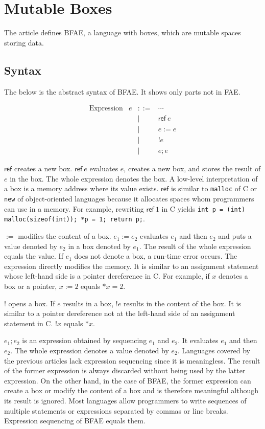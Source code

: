 \setchapterpreamble[u]{\margintoc}
\chapter{Mutable Boxes}

The article defines BFAE, a language with boxes, which are mutable spaces
storing data.

\section{Syntax
}

The below is the abstract syntax of BFAE. It shows only parts not in FAE.

\[
\begin{array}{lrcl}
\text{Expression} & e & ::= & \cdots \\
&& | & \textsf{ref}\ e \\
&& | & e:=e \\
&& | & !e \\
&& | & e;e
\end{array}
\]

\(\textsf{ref}\) creates a new box. \(\textsf{ref}\ e\) evaluates \(e\), creates
a new box, and stores the result of \(e\) in the box. The whole expression
denotes the box. A low-level interpretation of a box is a memory address
where its value exists. \(\textsf{ref}\) is similar to \verb!malloc! of C or
\verb!new! of object-oriented languages because it allocates spaces whom
programmers can use in a memory. For example, rewriting \(\textsf{ref}\ 1\) in C
yields \verb!int p = (int) malloc(sizeof(int)); *p = 1; return p;!.

\(:=\) modifies the content of a box. \(e_1:=e_2\) evaluates \(e_1\) and then
\(e_2\) and puts a value denoted by \(e_2\) in a box denoted by \(e_1\). The
result of the whole expression equals the value. If \(e_1\) does not denote a
box, a run-time error occurs. The expression directly modifies the memory. It is
similar to an assignment statement whose left-hand side is a pointer
dereference in C. For example, if \(x\) denotes a box or a pointer,
\(x:=2\) equals \(*x=2\).

\(!\) opens a box. If \(e\) results in a box, \(!e\) results in the content of
the box. It is similar to a pointer dereference not at the left-hand side of an
assignment statement in C. \(!x\) equals \(*x\).

\(e_1;e_2\) is an expression obtained by sequencing \(e_1\) and \(e_2\).
It evaluates \(e_1\) and then \(e_2\). The whole expression denotes a value
denoted by \(e_2\). Languages covered by the previous articles lack expression
sequencing since it is meaningless. The result of the former expression is always
discarded without being used by the latter expression. On the other hand, in the
case of BFAE, the former expression can create a box or modify the content of a
box and is therefore meaningful although its result is ignored. Most languages
allow programmers to write sequences of multiple statements or expressions
separated by commas or line breaks. Expression sequencing of BFAE equals them.

